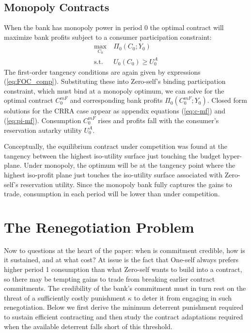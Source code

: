 \documentclass[11pt,english]{article}
\theoremstyle{plain}
\theoremstyle{definition}
\begin{document}
\subsection{Monopoly Contracts}

\label{sec:own}

When the bank has monopoly power in period 0 the optimal contract
will maximize bank profits subject to a consumer participation constraint:
\begin{align}
\max_{C_{0}} & \ \Pi_{0}\left(C_{0};Y_{0}\right)\label{eq:monop-obj}\\
\text{s.t.} & \ U_{0}\left(C_{0}\right)\geq U_{0}^{A}\label{eq:CPC0}
\end{align}
The first-order tangency conditions are again given by expressions
(\ref{eq:FOC_comp}). Substituting these into Zero-self's binding participation
constraint, which must bind at a monopoly optimum, we can solve
for the optimal contract $C_{0}^{mF}$ and corresponding bank profits
$\Pi_{0}\left(C_{0}^{mF};Y_{0}\right)$. Closed form solutions for
the CRRA case appear as appendix equations (\ref{eq:c-mf}) and (\ref{eq:pi-mf}).
Consumption $C_{0}^{mF}$ rises and profits fall with the consumer's
reservation autarky utility $U_{0}^{A}$.

Conceptually, the equilibrium contract under competition was found
at the tangency between the highest iso-utility surface just touching
the budget hyper-plane. Under monopoly, the optimum will
be at the tangency point where the highest iso-profit plane just touches
the iso-utility surface associated with Zero-self's reservation utility.
Since the monopoly bank fully captures the gains to trade, consumption
in each period will be lower than under competition. 

\section{The Renegotiation Problem}

\label{renegotiation}

Now to questions at the heart of the paper: when is commitment credible,
how is it sustained, and at what cost? At issue is the fact that One-self
always prefers higher period 1 consumption than what Zero-self wants
to build into a contract, so there may be tempting gains to trade
from breaking earlier contract commitments. The credibility of the
bank's commitment must in turn rest on the threat of a sufficiently
costly punishment $\kappa$ to deter it from engaging in such renegotiation.
Below we first derive the minimum deterrent punishment required to
sustain efficient contracting and then study the contract adaptations required
when the available deterrent falls short of this threshold.
\end{document}
